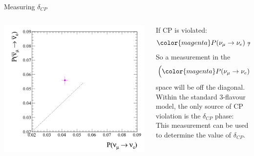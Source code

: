 %
%
\begin{frame}{Measuring $\delta_{CP}$}

\begin{columns}
  \begin{column}{0.60\textwidth}
    \begin{center}
      \includegraphics[width=0.99\textwidth]{./images/biprob/biprob_expt_hiprecision}
    \end{center}
  \end{column}
  \begin{column}{0.40\textwidth}
  {\small
       If CP is violated:
       \begin{equation*}
       {\color{magenta}
          P(\nu_{\mu} \rightarrow \nu_{e}) \ne
          P(\bar{\nu}_{\mu} \rightarrow \bar{\nu}_{e})
       }
       \end{equation*}
       \vspace{0.2cm}
       So a measurement in the
       \begin{equation*}
          \Big(
            {\color{magenta}
                 P(\nu_{\mu} \rightarrow \nu_{e}) }
           ,
            {\color{magenta}
                 P(\bar{\nu}_{\mu} \rightarrow \bar{\nu}_{e}) }
          \Big)
       \end{equation*}
       space will be off the diagonal.\\
      \vspace{0.4cm}
       Within the standard 3-flavour model, the only source of CP
       violation is the $\delta_{CP}$ phase:\\ This measurement can
       be used to determine the value of  $\delta_{CP}$.
  }
  \end{column}
\end{columns}

\end{frame}

